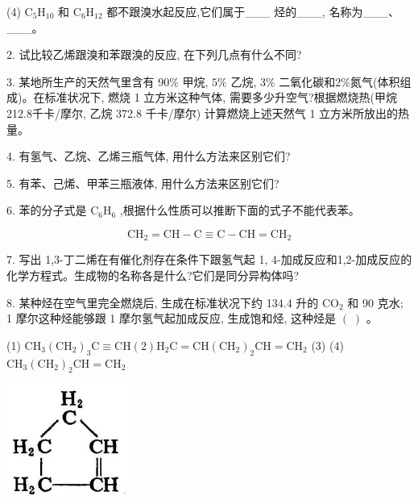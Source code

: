 \documentclass[10pt]{article}
\begin{document}
(4) \({\mathrm{C}}_{5}{\mathrm{H}}_{10}\) 和 \({\mathrm{C}}_{6}{\mathrm{H}}_{12}\) 都不跟溴水起反应,它们属于\_\_\_ 烃的\_\_\_, 名称为\_\_\_、\_\_\_。

2. 试比较乙烯跟溴和苯跟溴的反应, 在下列几点有什么不同?

\begin{center}
\end{center}

3. 某地所生产的天然气里含有 \({90}\%\) 甲烷, \(5\%\) 乙烷, \(3\%\) 二氧化碳和2\%氮气(体积组成)。在标准状况下, 燃烧 1 立方米这种气体, 需要多少升空气?根据燃烧热(甲烷212.8千卡/摩尔, 乙烷 372.8 千卡/摩尔) 计算燃烧上述天然气 1 立方米所放出的热量。

4. 有氢气、乙烷、乙烯三瓶气体, 用什么方法来区别它们?

5. 有苯、己烯、甲苯三瓶液体, 用什么方法来区别它们?

6. 苯的分子式是 \({\mathrm{C}}_{6}{\mathrm{H}}_{6}\) ,根据什么性质可以推断下面的式子不能代表苯。

\[
{\mathrm{{CH}}}_{2} = \mathrm{{CH}} - \mathrm{C} \equiv \mathrm{C} - \mathrm{{CH}} = {\mathrm{{CH}}}_{2}
\]

7. 写出 1,3-丁二烯在有催化剂存在条件下跟氢气起 1, 4-加成反应和1,2-加成反应的化学方程式。生成物的名称各是什么?它们是同分异构体吗?

8. 某种烃在空气里完全燃烧后, 生成在标准状况下约 134.4 升的 \({\mathrm{{CO}}}_{2}\) 和 90 克水; 1 摩尔这种烃能够跟 1 摩尔氢气起加成反应, 生成饱和烃, 这种烃是 \(\left( \;\right)\) 。

(1) \({\mathrm{{CH}}}_{3}{\left( {\mathrm{{CH}}}_{2}\right) }_{3}\mathrm{C} \equiv \mathrm{{CH}}\left( 2\right) {\mathrm{H}}_{2}\mathrm{C} = \mathrm{{CH}}{\left( {\mathrm{{CH}}}_{2}\right) }_{2}\mathrm{{CH}} = {\mathrm{{CH}}}_{2}\) (3) (4) \({\mathrm{{CH}}}_{3}{\left( {\mathrm{{CH}}}_{2}\right) }_{2}\mathrm{{CH}} = {\mathrm{{CH}}}_{2}\)

\begin{center}
\includegraphics[max width=0.3\textwidth]{images/01912d16-be99-77bb-9535-4f3ed8d9946f_108_186489.jpg}
\end{center}
\end{document}
